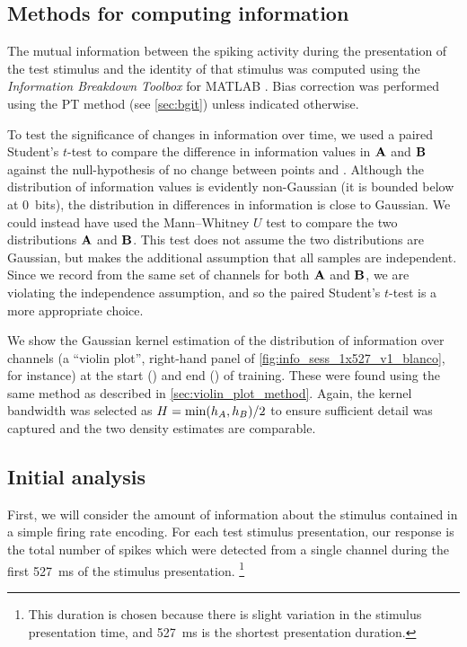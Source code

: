 \subsection{Methods for computing information}
\label{sec:info-methods}

The mutual information between the spiking activity during the presentation of the test stimulus and the identity of that stimulus was computed using the \textit{Information Breakdown Toolbox} for MATLAB \citep{Magri2009}.
Bias correction was performed using the \ac{PT} method (see \autoref{sec:bgit}) unless indicated otherwise.

To test the significance of changes in information over time, we used a paired Student's $t$-test to compare the difference in information values in $\mathbf{A}$ and $\mathbf{B}$ against the null-hypothesis of no change between points  and .
Although the distribution of information values is evidently non-Gaussian (it is bounded below at \SI{0}{bits}), the distribution in differences in information is close to Gaussian.
We could instead have used the Mann--Whitney $U$ test to compare the two distributions $\mathbf{A}$ and $\mathbf{B}$.
This test does not assume the two distributions are Gaussian, but makes the additional assumption that all samples are independent.
Since we record from the same set of channels for both $\mathbf{A}$ and $\mathbf{B}$, we are violating the independence assumption, and so the paired Student's $t$-test is a more appropriate choice.

We show the Gaussian kernel estimation of the distribution of information over channels (a ``violin plot'', right-hand panel of \autoref{fig:info_sess_1x527_v1_blanco}, for instance) at the start () and end () of training.
These were found using the same method as described in \autoref{sec:violin_plot_method}.
Again, the kernel bandwidth was selected as
$H = \min(h_{A}, h_{B}) / 2$
to ensure sufficient detail was captured and the two density estimates are comparable.


\subsection{Initial analysis}

First, we will consider the amount of information about the stimulus contained in a simple firing rate encoding.
For each test stimulus presentation, our response is the total number of spikes which were detected from a single channel during the first \SI{527}{\milli\second} of the stimulus presentation.%
\footnote{This duration is chosen because there is slight variation in the stimulus presentation time, and \SI{527}{\milli\second} is the shortest presentation duration.}

